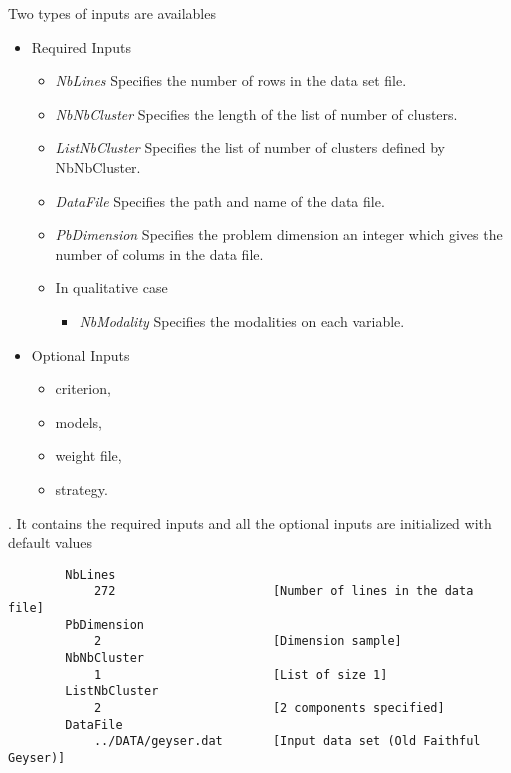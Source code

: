 Two types of inputs are availables
\begin{itemize}
  \item Required Inputs

\begin{itemize}
  \item {\em NbLines} Specifies the number of rows in the data set file.
   \item {\em NbNbCluster} Specifies the length of the list of number of clusters.
  \item {\em ListNbCluster} Specifies the list of number of clusters defined by NbNbCluster.
  \item {\em DataFile} Specifies the path and name of the data file.
  \item {\em PbDimension} Specifies the problem dimension an integer which gives the number of colums in the data file.

  \item In qualitative case
  \begin{itemize}
  \item{\em NbModality} Specifies the modalities on each variable.
  \end{itemize}

\end{itemize}
  \item Optional Inputs
 \begin{itemize}
 \item criterion,
 \item models,
 \item weight file,
 \item strategy.
 \end{itemize}
\end{itemize}

. It contains the required inputs and all the optional inputs are initialized with default values
{\scriptsize
\begin{verbatim}
        NbLines
            272                      [Number of lines in the data file]
        PbDimension
            2                        [Dimension sample]
        NbNbCluster
            1                        [List of size 1]
        ListNbCluster
            2                        [2 components specified]
        DataFile
            ../DATA/geyser.dat       [Input data set (Old Faithful Geyser)]
\end{verbatim}}




